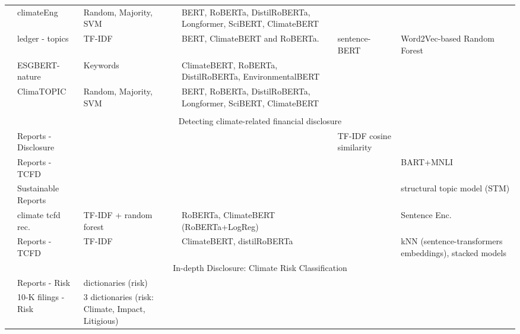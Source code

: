 \begin{longtable}[c]{lp{3cm}p{1.5cm}p{3cm}p{1.5cm}p{3cm}}
    \citet{spokoyny2023answering} & \raggedright climateEng & Random, Majority, SVM & BERT, RoBERTa, DistilRoBERTa, Longformer, SciBERT, ClimateBERT &  &  \\

    \citet{jain_supply_2023} & \raggedright ledger - topics  & TF-IDF & BERT, ClimateBERT and RoBERTa. & sentence-BERT &  Word2Vec-based Random Forest \\

    \citet{Schimanski2024nature} & \raggedright ESGBERT-nature  & Keywords &  ClimateBERT, RoBERTa, DistilRoBERTa, EnvironmentalBERT &  &  \\

    \citet{spokoyny2023answering} & \raggedright ClimaTOPIC & Random, Majority, SVM & BERT, RoBERTa, DistilRoBERTa, Longformer, SciBERT, ClimateBERT &  &  \\
&&&&&\\
    \multicolumn{6}{c}{Detecting climate-related financial disclosure} \\
    \midrule
    \citet{dingCarbonEmissionsTCFD2023} & \raggedright Reports - Disclosure &   &  & TF-IDF cosine similarity &  \\

    \citet{auzepy_evaluating_2023} & \raggedright Reports - TCFD &   &  &  & BART+MNLI \\

    \citet{bjarne_brie_mandatory_2022} & \raggedright Sustainable Reports &   &  &  & structural topic model (STM) \\

    \citet{bingler_cheap_2021} & \raggedright climate tcfd rec. &  \raggedright TF-IDF + random forest & RoBERTa, ClimateBERT (RoBERTa+LogReg) &  & Sentence Enc. \\

    \citet{sampson_tcfd-nlp_nodate} & \raggedright Reports - TCFD &  TF-IDF & \raggedright ClimateBERT, distilRoBERTa &  &  kNN (sentence-transformers embeddings), stacked models \\

    \multicolumn{6}{c}{In-depth Disclosure: Climate Risk Classification} \\
\midrule
    \citet{liCorporateClimateRisk2020} & \raggedright Reports - Risk &  dictionaries (risk) &  &  &  \\

    \citet{chou_ESG} & \raggedright 10-K filings - Risk &  3 dictionaries (risk: Climate, Impact, Litigious) &  &  &  \\


\end{longtable}
